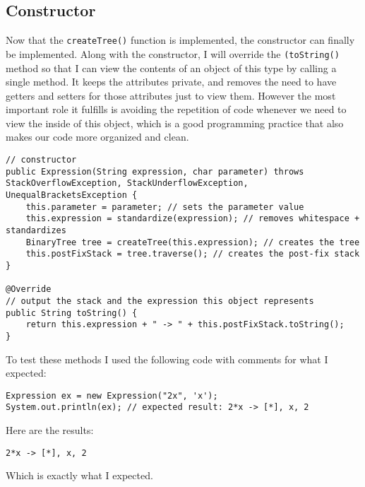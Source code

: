 \documentclass[../../../../main.tex]{subfiles}
\begin{document}
\subsection{Constructor}
Now that the \texttt{createTree()} function is implemented, the constructor can finally be implemented. Along with the constructor, I will override the \texttt{(toString()} method so that I can view the contents of an object of this type by calling a single method. It keeps the attributes private, and removes the need to have getters and setters for those attributes just to view them. However the most important role it fulfills is avoiding the repetition of code whenever we need to view the inside of this object, which is a good programming practice that also makes our code more organized and clean.

\begin{verbatim}
// constructor
public Expression(String expression, char parameter) throws StackOverflowException, StackUnderflowException, UnequalBracketsException {
	this.parameter = parameter; // sets the parameter value
	this.expression = standardize(expression); // removes whitespace + standardizes
	BinaryTree tree = createTree(this.expression); // creates the tree
	this.postFixStack = tree.traverse(); // creates the post-fix stack
}

@Override
// output the stack and the expression this object represents
public String toString() {
	return this.expression + " -> " + this.postFixStack.toString();
}
\end{verbatim}
To test these methods I used the following code with comments for what I expected:
\begin{verbatim}
Expression ex = new Expression("2x", 'x');
System.out.println(ex);	// expected result: 2*x -> [*], x, 2
\end{verbatim}
Here are the results:
\begin{verbatim}
2*x -> [*], x, 2
\end{verbatim}
Which is exactly what I expected.
\newpage
\end{document}
